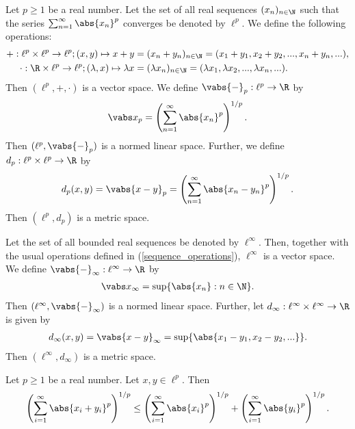 \documentclass{article}
\begin{document}
\begin{lemma}
	Let $p\geq 1$ be a real number.
	Let the set of all real sequences $(x_n)_{n\in\N}$ such that the series
	$\sum_{n=1}^\infty \abs{x_n}^p$ converges be denoted by $\ell^p$.
	We define the following operations:
	\begin{align}
		\label{sequence_operations}
		+:\ell^p\times \ell^p\to \ell^p;(x,y)\mapsto x+y            & =(x_n+y_n)_{n\in\N}=(x_1+y_1,x_2+y_2,...,x_n+y_n,...),                 \\
		\cdot:\R\times \ell^p\to \ell^p;(\lambda,x)\mapsto\lambda x & =(\lambda x_n)_{n\in\N}=(\lambda x_1,\lambda x_2,...,\lambda x_n,...).
	\end{align}
	Then $(\ell^p,+,\cdot)$ is a vector space.
	We define $\vabs{-}_p:\ell^p\to\R$ by
	\begin{align*}
		\vabs x_p = \left(\sum_{n=1}^\infty \abs{x_n}^p\right)^{1/p}.
	\end{align*}
	Then $(\ell^p, \vabs{-}_p)$ is a normed linear space.
	Further, we define $d_p:\ell^p\times \ell^p\to\R$ by
	\begin{align*}
		d_p(x,y)=\vabs{x-y}_p=\left(\sum_{n=1}^\infty\abs{x_n-y_n}^p\right)^{1/p}.
	\end{align*}
	Then $(\ell^p,d_p)$ is a metric space.
\end{lemma}

\begin{lemma}
	Let the set of all bounded real sequences be denoted by $\ell^\infty$. Then, together with
	the usual operations defined in (\ref{sequence_operations}), $\ell^\infty$ is a vector space.
	We define $\vabs{-}_\infty:\ell^\infty\to\R$ by
	\begin{align*}
		\vabs x_\infty = \sup\{\abs{x_n}:n\in\N\}.
	\end{align*}
	Then $(\ell^\infty,\vabs{-}_\infty)$ is a normed linear space.
	Further, let $d_\infty:\ell^\infty\times \ell^\infty\to\R$ is given by
	\begin{align*}
		d_\infty(x,y)=\vabs{x-y}_\infty = \sup\{\abs{x_1-y_1,x_2-y_2,...}\}.
	\end{align*}
	Then $(\ell^\infty, d_\infty)$ is a metric space.
\end{lemma}

\begin{lemma}
	Let $p\geq 1$ be a real number. Let $x,y\in \ell^p$. Then
	\begin{align*}
		\left(\sum_{i=1}^\infty \abs{x_i+y_i}^p\right)^{1/p}
		\leq \left(\sum_{i=1}^\infty \abs{x_i}^p\right)^{1/p}
		+ \left(\sum_{i=1}^\infty \abs{y_i}^p\right)^{1/p}.
	\end{align*}
\end{lemma}
\end{document}
